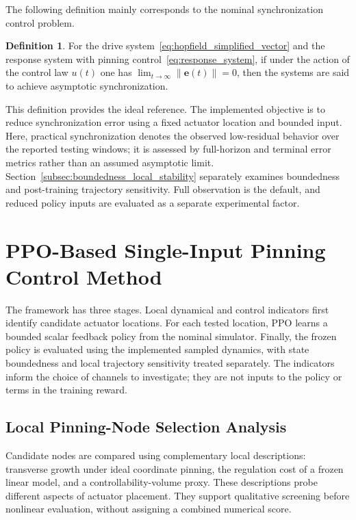 \documentclass[a4paper,fleqn]{cas-sc}
\theoremstyle{plain}
\theoremstyle{definition}
\newtheorem{definition}{Definition}
\begin{document}
The following definition mainly corresponds to the nominal synchronization control problem.
\begin{definition}
	For the drive system~\eqref{eq:hopfield_simplified_vector} and the response system with pinning control~\eqref{eq:response_system}, if under the action of the control law $u(t)$ one has $\lim_{t \to \infty} \| \mathbf{e}(t) \| = 0$, then the systems are said to achieve asymptotic synchronization.
\end{definition}

This definition provides the ideal reference. The implemented objective is to reduce synchronization error using a fixed actuator location and bounded input. Here, practical synchronization denotes the observed low-residual behavior over the reported testing windows; it is assessed by full-horizon and terminal error metrics rather than an assumed asymptotic limit. Section~\ref{subsec:boundedness_local_stability} separately examines boundedness and post-training trajectory sensitivity. Full observation is the default, and reduced policy inputs are evaluated as a separate experimental factor.

\section{PPO-Based Single-Input Pinning Control Method}
\label{sec:ppo_pinning_method}

The framework has three stages. Local dynamical and control indicators first identify candidate actuator locations. For each tested location, PPO learns a bounded scalar feedback policy from the nominal simulator. Finally, the frozen policy is evaluated using the implemented sampled dynamics, with state boundedness and local trajectory sensitivity treated separately. The indicators inform the choice of channels to investigate; they are not inputs to the policy or terms in the training reward.

\subsection{Local Pinning-Node Selection Analysis}
\label{subsec:local_node_selection}

Candidate nodes are compared using complementary local descriptions: transverse growth under ideal coordinate pinning, the regulation cost of a frozen linear model, and a controllability-volume proxy. These descriptions probe different aspects of actuator placement. They support qualitative screening before nonlinear evaluation, without assigning a combined numerical score.
\end{document}
